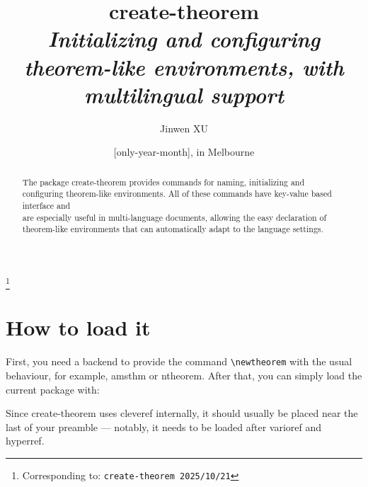 \documentclass[classical]{einfart}
\newcommand{\meta}[1]{$\langle${\normalfont\itshape#1}$\rangle$}
\newenvironment{tip}[1][Tip]
  {%
    \LocallyStopLineNumbers%
    \begin{tcolorbox}[breakable,
        enhanced,
        width = \textwidth,
        colback = paper, colbacktitle = paper,
        colframe = gray!50, boxrule=0.2mm,
        coltitle = black,
        fonttitle = \sffamily,
        attach boxed title to top left = {yshift=-\tcboxedtitleheight/2, xshift=.5cm},
        boxed title style = {boxrule=0pt, colframe=paper},
        before skip = 3mm,
        after skip = 3mm,
        top = 2.5mm,
        bottom = 1.5mm,
        title={\scshape\sffamily #1}]%
  }
  {%
    \end{tcolorbox}%
    \ResumeLineNumbers%
  }
\newcommand{\createtheorempackage}{\textsf{create-theorem}}
\begin{document}
\def\PackageVersion{2025/10/21}
\def\PackageSubVersion{}

\title{\createtheorempackage{}\\\smallskip\itshape Initializing and configuring theorem-like environments, with multilingual support}
\author{Jinwen XU}
\thanks{Corresponding to: \texttt{\createtheorempackage{} \PackageVersion\PackageSubVersion}}
\date{\TheDate{\PackageVersion}[only-year-month], in Melbourne}

\maketitle

\begin{abstract}
    \raggedleft
    The package \createtheorempackage{} provides commands for naming, initializing and configuring theorem-like environments. All of these commands have key-value based interface and \\are especially useful in multi-language documents, allowing the easy declaration of \\theorem-like environments that can automatically adapt to the language settings.
\end{abstract}

\vspace{-.5\baselineskip}



\section{How to load it}

First, you need a backend to provide the command \lstinline|\newtheorem| with the usual behaviour, for example, \textsf{amsthm} or \textsf{ntheorem}. After that, you can simply load the current package with:

\begin{code}
\usepackage[(*\meta{options}*)]{create-theorem}
\end{code}

\begin{tip}[Attention]
    Since \createtheorempackage{} uses \textsf{cleveref} internally, it should usually be placed near the last of your preamble --- notably, it needs to be loaded after \textsf{varioref} and \textsf{hyperref}.
\end{tip}
\end{document}
